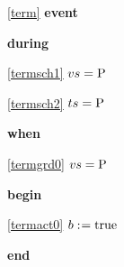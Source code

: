 \noindent \ref{term}  \textbf{event}
\begin{block}
  \item   \textbf{during}
  \begin{block}
  \item[ \eqref{termsch1} ]\sout{$vs = \text{P}$} %
  \end{block}
  \begin{block}
  \item[ \eqref{termsch2} ]{$ts = \text{P} $} %
  \end{block}
  \item   \textbf{when}
  \begin{block}
  \item[ \eqref{termgrd0} ]{$vs = \text{P}$} %
  \end{block}
  \item   \textbf{begin}
  \begin{block}
  \item[ \eqref{termact0} ]{$b \mathrel{:\mkern1mu=} \text{true}$} %
  \end{block}
  \item   \textbf{end} \\
\end{block}
